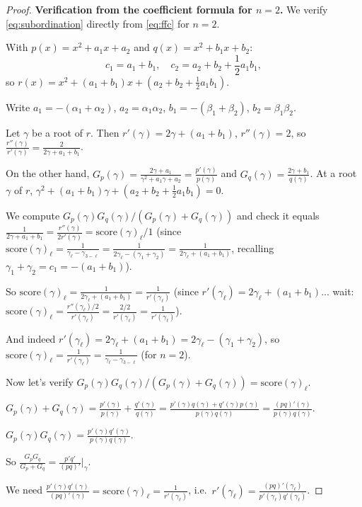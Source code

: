 \documentclass[12pt]{article}
\theoremstyle{definition}
\newcommand{\score}{\mathrm{score}}
\begin{document}
\begin{proof}
\textbf{Verification from the coefficient formula for $n=2$.}
We verify \eqref{eq:subordination} directly from \eqref{eq:ffc} for $n=2$.

With $p(x)=x^2+a_1 x+a_2$ and $q(x)=x^2+b_1 x+b_2$:
\[
  c_1 = a_1+b_1,\quad
  c_2 = a_2+b_2+\frac{1}{2}a_1 b_1,
\]
so $r(x)=x^2+(a_1+b_1)x+(a_2+b_2+\frac{1}{2}a_1 b_1)$.

Write $a_1=-(\alpha_1+\alpha_2)$, $a_2=\alpha_1\alpha_2$, $b_1=-(\beta_1+\beta_2)$, $b_2=\beta_1\beta_2$.

Let $\gamma$ be a root of $r$.  Then $r'(\gamma)=2\gamma+(a_1+b_1)$,
$r''(\gamma)=2$, so $\frac{r''(\gamma)}{r'(\gamma)}=\frac{2}{2\gamma+a_1+b_1}$.

On the other hand, $G_p(\gamma)=\frac{2\gamma+a_1}{\gamma^2+a_1\gamma+a_2}=\frac{p'(\gamma)}{p(\gamma)}$
and $G_q(\gamma)=\frac{2\gamma+b_1}{q(\gamma)}$.  At a root $\gamma$ of $r$,
$\gamma^2+(a_1+b_1)\gamma+(a_2+b_2+\frac{1}{2}a_1b_1)=0$.

We compute $G_p(\gamma)G_q(\gamma)/(G_p(\gamma)+G_q(\gamma))$ and check it equals
$\frac{1}{2\gamma+a_1+b_1}=\frac{r''(\gamma)}{2r'(\gamma)}=\score(\gamma)_\ell/1$ (since
$\score(\gamma)_\ell=\frac{1}{\gamma_\ell-\gamma_{3-\ell}}=\frac{1}{2\gamma_\ell-(\gamma_1+\gamma_2)}
=\frac{1}{2\gamma_\ell+(a_1+b_1)}$, recalling $\gamma_1+\gamma_2=c_1=-(a_1+b_1)$).

So $\score(\gamma)_\ell=\frac{1}{2\gamma_\ell+(a_1+b_1)}=\frac{1}{r'(\gamma_\ell)}$ (since $r'(\gamma_\ell)=2\gamma_\ell+(a_1+b_1)$... wait: $\score(\gamma)_\ell=\frac{r''(\gamma_\ell)/2}{r'(\gamma_\ell)}=\frac{2/2}{r'(\gamma_\ell)}=\frac{1}{r'(\gamma_\ell)}$).

And indeed $r'(\gamma_\ell)=2\gamma_\ell+(a_1+b_1)=2\gamma_\ell-(\gamma_1+\gamma_2)$, so
$\score(\gamma)_\ell=\frac{1}{r'(\gamma_\ell)}=\frac{1}{\gamma_\ell-\gamma_{3-\ell}}$ (for $n=2$).

Now let's verify $G_p(\gamma)G_q(\gamma)/(G_p(\gamma)+G_q(\gamma))=\score(\gamma)_\ell$.

$G_p(\gamma)+G_q(\gamma)=\frac{p'(\gamma)}{p(\gamma)}+\frac{q'(\gamma)}{q(\gamma)}
=\frac{p'(\gamma)q(\gamma)+q'(\gamma)p(\gamma)}{p(\gamma)q(\gamma)}
=\frac{(pq)'(\gamma)}{p(\gamma)q(\gamma)}$.

$G_p(\gamma)G_q(\gamma)=\frac{p'(\gamma)q'(\gamma)}{p(\gamma)q(\gamma)}$.

So $\frac{G_p G_q}{G_p+G_q}=\frac{p'q'}{(pq)'}\bigg|_{\gamma}$.

We need $\frac{p'(\gamma)q'(\gamma)}{(pq)'(\gamma)}=\score(\gamma)_\ell=\frac{1}{r'(\gamma_\ell)}$,
i.e.\ $r'(\gamma_\ell)=\frac{(pq)'(\gamma_\ell)}{p'(\gamma_\ell)q'(\gamma_\ell)}$.


\end{proof}
\end{document}

